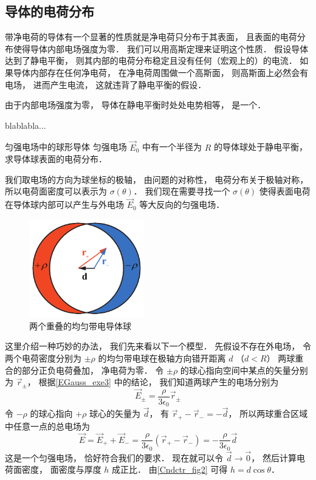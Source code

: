

\subsection{导体的电荷分布}
带净电荷的导体有一个显著的性质就是净电荷只分布于其表面， 且表面的电荷分布使得导体内部电场强度为零． 我们可以用高斯定理来证明这个性质． 假设导体达到了静电平衡， 则其内部的电荷分布稳定且没有任何（宏观上的）的电流． 如果导体内部存在任何净电荷， 在净电荷周围做一个高斯面， 则高斯面上必然会有电场， 进而产生电流， 这就违背了静电平衡的假设．

由于内部电场强度为零， 导体在静电平衡时处处电势相等， 是一个．


blablabla...

\begin{exam}{匀强电场中的球形导体}
匀强电场 $\vec E_0$ 中有一个半径为 $R$ 的导体球处于静电平衡， 求导体球表面的电荷分布．

我们取电场的方向为球坐标的极轴， 由问题的对称性， 电荷分布关于极轴对称， 所以电荷面密度可以表示为 $\sigma(\theta)$． 我们现在需要寻找一个 $\sigma(\theta)$ 使得表面电荷在导体球内部可以产生与外电场 $\vec E_0$ 等大反向的匀强电场．

\begin{figure}[ht]
\centering
\includegraphics[width=5cm]{./figures/Cndctr1.pdf}
\caption{两个重叠的均匀带电导体球} \label{Cndctr_fig1}
\end{figure}

这里介绍一种巧妙的办法， 我们先来看以下一个模型． 先假设不存在外电场， 令两个电荷密度分别为 $\pm\rho$ 的均匀带电球在极轴方向错开距离 $d$ （$d < R$） 两球重合的部分正负电荷叠加， 净电荷为零． 令 $\pm\rho$ 的球心指向空间中某点的矢量分别为 $\vec r_\pm$， 根据\autoref{EGauss_exe3} 中的结论， 我们知道两球产生的电场分别为
\begin{equation}
\vec E_\pm = \frac{\rho}{3\epsilon_0}\vec r_\pm
\end{equation}
令 $-\rho$ 的球心指向 $+\rho$ 球心的矢量为 $\vec d$， 有 $\vec r_+ - \vec r_- = -\vec d$， 所以两球重合区域中任意一点的总电场为
\begin{equation}
\vec E = \vec E_+ + \vec E_- = \frac{\rho}{3\epsilon_0}(\vec r_+ - \vec r_-) = -\frac{\rho}{3\epsilon_0}\vec d
\end{equation}
这是一个匀强电场， 恰好符合我们的要求． 现在就可以令 $\vec d\to \vec 0$， 然后计算电荷面密度， 面密度与厚度 $h$ 成正比． 由\autoref{Cndctr_fig2} 可得 $h = d\cos\theta$．


\end{exam}
